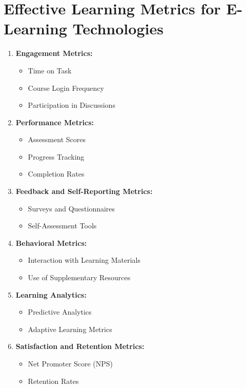 \section*{Effective Learning Metrics for E-Learning Technologies}

\begin{enumerate}
    \item \textbf{Engagement Metrics:}
    \begin{itemize}
        \item Time on Task
        \item Course Login Frequency
        \item Participation in Discussions
    \end{itemize}

    \item \textbf{Performance Metrics:}
    \begin{itemize}
        \item Assessment Scores
        \item Progress Tracking
        \item Completion Rates
    \end{itemize}

    \item \textbf{Feedback and Self-Reporting Metrics:}
    \begin{itemize}
        \item Surveys and Questionnaires
        \item Self-Assessment Tools
    \end{itemize}

    \item \textbf{Behavioral Metrics:}
    \begin{itemize}
        \item Interaction with Learning Materials
        \item Use of Supplementary Resources
    \end{itemize}

    \item \textbf{Learning Analytics:}
    \begin{itemize}
        \item Predictive Analytics
        \item Adaptive Learning Metrics
    \end{itemize}

    \item \textbf{Satisfaction and Retention Metrics:}
    \begin{itemize}
        \item Net Promoter Score (NPS)
        \item Retention Rates
    \end{itemize}


\end{enumerate}
